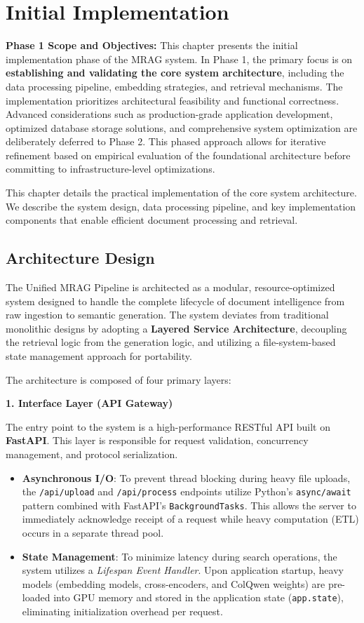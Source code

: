 \chapter{Initial Implementation}

\textbf{Phase 1 Scope and Objectives:} This chapter presents the initial implementation phase of the MRAG system. In Phase 1, the primary focus is on \textbf{establishing and validating the core system architecture}, including the data processing pipeline, embedding strategies, and retrieval mechanisms. The implementation prioritizes architectural feasibility and functional correctness. Advanced considerations such as production-grade application development, optimized database storage solutions, and comprehensive system optimization are deliberately deferred to Phase 2. This phased approach allows for iterative refinement based on empirical evaluation of the foundational architecture before committing to infrastructure-level optimizations.

This chapter details the practical implementation of the core system architecture. We describe the system design, data processing pipeline, and key implementation components that enable efficient document processing and retrieval.

\section{Architecture Design}

The Unified MRAG Pipeline is architected as a modular, resource-optimized system designed to handle the complete lifecycle of document intelligence from raw ingestion to semantic generation. The system deviates from traditional monolithic designs by adopting a \textbf{Layered Service Architecture}, decoupling the retrieval logic from the generation logic, and utilizing a file-system-based state management approach for portability.

The architecture is composed of four primary layers:

\textbf{1. Interface Layer (API Gateway)}

The entry point to the system is a high-performance RESTful API built on \textbf{FastAPI}. This layer is responsible for request validation, concurrency management, and protocol serialization.
\begin{itemize}
    \item \textbf{Asynchronous I/O}: To prevent thread blocking during heavy file uploads, the \texttt{/api/upload} and \texttt{/api/process} endpoints utilize Python's \texttt{async/await} pattern combined with FastAPI's \texttt{BackgroundTasks}. This allows the server to immediately acknowledge receipt of a request while heavy computation (ETL) occurs in a separate thread pool.
    \item \textbf{State Management}: To minimize latency during search operations, the system utilizes a \textit{Lifespan Event Handler}. Upon application startup, heavy models (embedding models, cross-encoders, and ColQwen weights) are pre-loaded into GPU memory and stored in the application state (\texttt{app.state}), eliminating initialization overhead per request.
\end{itemize}

